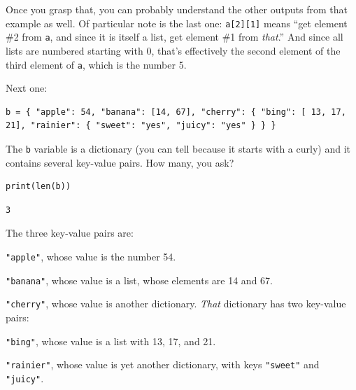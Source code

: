 Once you grasp that, you can probably understand the other outputs from that
example as well. Of particular note is the last one: \texttt{a[2][1]} means
``get element \#2 from \texttt{a}, and since it is itself a list, get element
\#1 from \textit{that}.'' And since all lists are numbered starting with 0,
that's effectively the second element of the third element of \texttt{a}, which
is the number 5.

Next one:


\begin{Verbatim}[fontsize=\small,samepage=true,frame=leftline,framesep=5mm,framerule=1mm]
b = { "apple": 54, "banana": [14, 67], "cherry": { "bing": [ 13, 17,
21], "rainier": { "sweet": "yes", "juicy": "yes" } } }
\end{Verbatim}


The \texttt{b} variable is a dictionary (you can tell because it starts with a
curly) and it contains several key-value pairs. How many, you ask?

\begin{Verbatim}[fontsize=\small,samepage=true,frame=single,framesep=3mm]
print(len(b))
\end{Verbatim}
\vspace{-.2in}

\begin{Verbatim}[fontsize=\small,samepage=true,frame=leftline,framesep=5mm,framerule=1mm]
3
\end{Verbatim}

The three key-value pairs are:

\begin{compactitem}
\item \texttt{"apple"}, whose value is the number 54.
\item \texttt{"banana"}, whose value is a list, whose elements are 14 and 67.
\item \texttt{"cherry"}, whose value is another dictionary. \textit{That}
dictionary has two key-value pairs:
    \begin{compactitem}
    \item \texttt{"bing"}, whose value is a list with 13, 17, and 21.
    \item \texttt{"rainier"}, whose value is yet another dictionary, with keys
\texttt{"sweet"} and \texttt{"juicy"}.
    \end{compactitem}
\end{compactitem}

